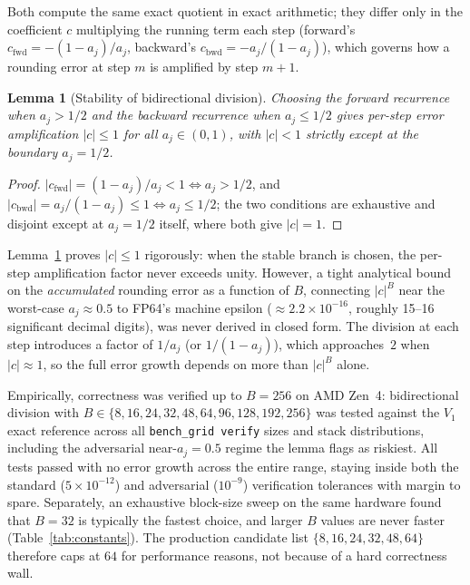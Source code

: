 \documentclass[11pt]{article}
\newtheorem{lemma}[theorem]{Lemma}
\begin{document}
Both compute the same exact quotient in exact arithmetic; they differ only
in the coefficient $c$ multiplying the running term each step (forward's
$c_{\text{fwd}} = -(1-a_j)/a_j$, backward's $c_{\text{bwd}} = -a_j/(1-a_j)$),
which governs how a rounding error at step $m$ is amplified by step $m+1$.

\begin{lemma}[Stability of bidirectional division]\label{lem:division-stability}
Choosing the forward recurrence when $a_j > 1/2$ and the backward
recurrence when $a_j \le 1/2$ gives per-step error amplification
$|c| \le 1$ for all $a_j \in (0,1)$, with $|c| < 1$ strictly except at the
boundary $a_j = 1/2$.
\end{lemma}
\begin{proof}
$|c_{\text{fwd}}| = (1-a_j)/a_j < 1 \iff a_j > 1/2$, and
$|c_{\text{bwd}}| = a_j/(1-a_j) \le 1 \iff a_j \le 1/2$; the two conditions
are exhaustive and disjoint except at $a_j = 1/2$ itself, where both give
$|c| = 1$.
\end{proof}

Lemma~\ref{lem:division-stability} proves $|c| \le 1$ rigorously: when the
stable branch is chosen, the per-step amplification factor never exceeds
unity. However, a tight analytical bound on the \emph{accumulated} rounding
error as a function of $B$, connecting $|c|^B$ near the worst-case
$a_j \approx 0.5$ to FP64's machine epsilon ($\approx 2.2 \times 10^{-16}$,
roughly 15--16 significant decimal digits), was never derived in closed
form. The division at each step introduces a factor of $1/a_j$ (or
$1/(1-a_j)$), which approaches~$2$ when $|c| \approx 1$, so the full
error growth depends on more than $|c|^B$ alone.

Empirically, correctness was verified up to $B = 256$ on AMD Zen~4:
bidirectional division with $B \in \{8, 16, 24, 32, 48, 64, 96, 128, 192,
256\}$ was tested against the $V_1$ exact reference across all
\texttt{bench\_grid verify} sizes and stack distributions, including the
adversarial near-$a_j = 0.5$ regime the lemma flags as riskiest. All
tests passed with no error growth across the entire range, staying inside
both the standard ($5 \times 10^{-12}$) and adversarial ($10^{-9}$)
verification tolerances with margin to spare.
Separately, an exhaustive block-size sweep on the same hardware found
that $B = 32$ is typically the fastest choice, and larger $B$ values are
never faster (Table~\ref{tab:constants}). The production candidate list
$\{8, 16, 24, 32, 48, 64\}$ therefore caps at $64$ for performance
reasons, not because of a hard correctness wall.
\end{document}
